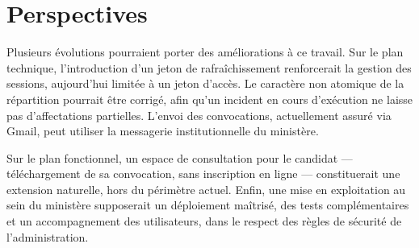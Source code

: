 \chapter*{Perspectives}
\adjustmtc
\thispagestyle{MyStyle}
\begin{onehalfspace}

Plusieurs évolutions pourraient porter des améliorations à ce travail. Sur le plan technique, l'introduction d'un jeton de rafraîchissement renforcerait la gestion des sessions, aujourd'hui limitée à un jeton d'accès. Le caractère non atomique de la répartition pourrait être corrigé, afin qu'un incident en cours d'exécution ne laisse pas d'affectations partielles. L'envoi des convocations, actuellement assuré via Gmail, peut utiliser la messagerie institutionnelle du ministère.

Sur le plan fonctionnel, un espace de consultation pour le candidat --- téléchargement de sa convocation, sans inscription en ligne --- constituerait une extension naturelle, hors du périmètre actuel. Enfin, une mise en exploitation au sein du ministère supposerait un déploiement maîtrisé, des tests complémentaires et un accompagnement des utilisateurs, dans le respect des règles de sécurité de l'administration.

\end{onehalfspace}
